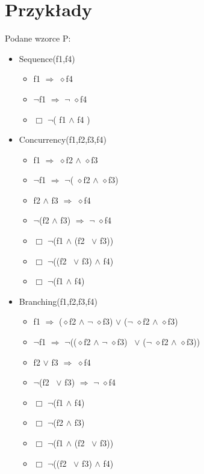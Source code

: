 \documentclass[a4paper, 11pt]{article}
\begin{document}
	\section{Przykłady}
Podane wzorce P:
	\begin{itemize}
					\item Sequence(f1,f4)
		\begin{itemize}
			\item f1 $ \Rightarrow $  $\diamond$f4 	
			\item $\neg$f1 $ \Rightarrow $ $\neg$ $\diamond$f4
			\item $\Box$ $\neg$( f1  $\wedge$  f4 )
		\end{itemize}
		\item Concurrency(f1,f2,f3,f4)
		\begin{itemize}
			\item f1 $ \Rightarrow $  $\diamond$f2  $\wedge$  $\diamond$f3
			\item $\neg$f1 $ \Rightarrow $  $\neg$( $\diamond$f2  $\wedge$  $\diamond$f3)
			\item f2  $\wedge$  f3  $ \Rightarrow$  $\diamond$f4
			\item $\neg$(f2  $\wedge$  f3)  $ \Rightarrow $  $\neg$ $\diamond$f4
			\item $\Box$ $\neg$(f1  $\wedge$  (f2 \ $\vee$  f3))
			\item $\Box$ $\neg$((f2 \ $\vee$  f3)  $\wedge$  f4)
			\item $\Box$ $\neg$(f1  $\wedge$  f4)	
		\end{itemize}
		\item Branching(f1,f2,f3,f4)
		\begin{itemize}
			\item f1  $ \Rightarrow $  ($\diamond$f2  $\wedge$  $\neg$ $\diamond$f3)  $\vee$  ($\neg$ $\diamond$f2  $\wedge$  $\diamond$f3)
			\item $\neg$f1  $ \Rightarrow $  $\neg$(($\diamond$f2  $\wedge$  $\neg$ $\diamond$f3) \ $\vee$  ($\neg$ $\diamond$f2  $\wedge$  $\diamond$f3))
			\item f2 $\vee$  f3  $ \Rightarrow $  $\diamond$f4
			\item $\neg$(f2 \ $\vee$  f3)  $ \Rightarrow$  $\neg$ $\diamond$f4
			\item $\Box$ $\neg$(f1  $\wedge$  f4)
			\item $\Box$ $\neg$(f2  $\wedge$  f3)
			\item $\Box$ $\neg$(f1  $\wedge$  (f2 \ $\vee$  f3))
			\item $\Box$ $\neg$((f2 \ $\vee$  f3)  $\wedge$  f4)

\end{itemize}
\end{itemize}
\end{document}
